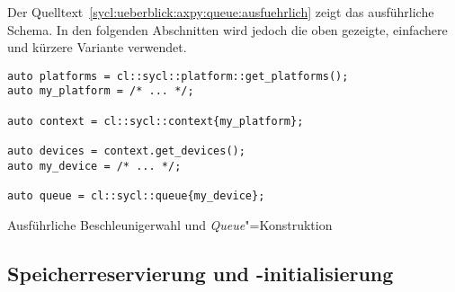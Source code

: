 Der Quelltext~\ref{sycl:ueberblick:axpy:queue:ausfuehrlich} zeigt das
ausführliche Schema. In den folgenden Abschnitten wird jedoch die oben gezeigte,
einfachere und kürzere Variante verwendet.

\begin{code}
    \begin{verbatim}
auto platforms = cl::sycl::platform::get_platforms();
auto my_platform = /* ... */;

auto context = cl::sycl::context{my_platform};

auto devices = context.get_devices();
auto my_device = /* ... */;

auto queue = cl::sycl::queue{my_device};
    \end{verbatim}
    \caption{Ausführliche Beschleunigerwahl und \textit{Queue}"=Konstruktion}
    \label{sycl:ueberblick:axpy:queue:ausfuehrlich}
\end{code}

\subsection{Speicherreservierung und -initialisierung}
\label{sycl:ueberblick:axpy:buffer}

